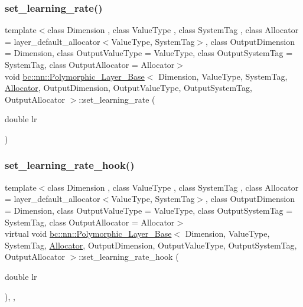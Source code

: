 \subsubsection{\texorpdfstring{set\+\_\+learning\+\_\+rate()}{set\_learning\_rate()}\hspace{0.1cm}{\footnotesize\ttfamily [2/2]}}
{\footnotesize\ttfamily template$<$class Dimension , class Value\+Type , class System\+Tag , class Allocator  = layer\+\_\+default\+\_\+allocator$<$\+Value\+Type, System\+Tag$>$, class Output\+Dimension  = Dimension, class Output\+Value\+Type  = Value\+Type, class Output\+System\+Tag  = System\+Tag, class Output\+Allocator  = Allocator$>$ \\
void \hyperlink{structbc_1_1nn_1_1Polymorphic__Layer__Base}{bc\+::nn\+::\+Polymorphic\+\_\+\+Layer\+\_\+\+Base}$<$ Dimension, Value\+Type, System\+Tag, \hyperlink{classbc_1_1allocators_1_1Allocator}{Allocator}, Output\+Dimension, Output\+Value\+Type, Output\+System\+Tag, Output\+Allocator $>$\+::set\+\_\+learning\+\_\+rate (\begin{DoxyParamCaption}\item[{double}]{lr }\end{DoxyParamCaption})\hspace{0.3cm}{\ttfamily [inline]}}

\mbox{\label{structbc_1_1nn_1_1Polymorphic__Layer__Base_add15aef38db94de6066d048149723eea}} 
\subsubsection{\texorpdfstring{set\+\_\+learning\+\_\+rate\+\_\+hook()}{set\_learning\_rate\_hook()}\hspace{0.1cm}{\footnotesize\ttfamily [1/2]}}
{\footnotesize\ttfamily template$<$class Dimension , class Value\+Type , class System\+Tag , class Allocator  = layer\+\_\+default\+\_\+allocator$<$\+Value\+Type, System\+Tag$>$, class Output\+Dimension  = Dimension, class Output\+Value\+Type  = Value\+Type, class Output\+System\+Tag  = System\+Tag, class Output\+Allocator  = Allocator$>$ \\
virtual void \hyperlink{structbc_1_1nn_1_1Polymorphic__Layer__Base}{bc\+::nn\+::\+Polymorphic\+\_\+\+Layer\+\_\+\+Base}$<$ Dimension, Value\+Type, System\+Tag, \hyperlink{classbc_1_1allocators_1_1Allocator}{Allocator}, Output\+Dimension, Output\+Value\+Type, Output\+System\+Tag, Output\+Allocator $>$\+::set\+\_\+learning\+\_\+rate\+\_\+hook (\begin{DoxyParamCaption}\item[{double}]{lr }\end{DoxyParamCaption})\hspace{0.3cm}{\ttfamily [inline]}, {\ttfamily [protected]}, {\ttfamily [virtual]}}

